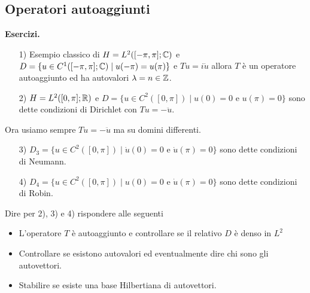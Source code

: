\subsection{Operatori autoaggiunti}

\textbf{Esercizi.}
\begin{enumerate}
	\item[1)] Esempio classico di $H = L^2([-\pi, \pi]; \mathbb C)$ e $D = \{ u \in C^1([-\pi, \pi]; \mathbb C) \mid u(-\pi) = u(\pi) \}$ e $T u = i \dot u$ allora $T$ è un operatore autoaggiunto ed ha autovalori $\lambda = n \in \mathbb Z$.
	
	\item[2)] $H = L^2([0, \pi]; \mathbb R)$ e $D = \{ u \in C^2([0, \pi]) \mid u(0) = 0 \text{ e } u(\pi) = 0 \}$ sono dette condizioni di Dirichlet con $T u = - \ddot u$.
\end{enumerate}

Ora usiamo sempre $T u = -\ddot u$ ma su domini differenti.

\begin{enumerate}
	\item[3)] $D_3 = \{ u \in C^2([0, \pi]) \mid \dot u(0) = 0 \text{ e } \dot u(\pi) = 0 \}$ sono dette condizioni di Neumann.
	
	\item[4)] $D_4 = \{ u \in C^2([0, \pi]) \mid u(0) = 0 \text{ e } \dot u(\pi) = 0 \}$ sono dette condizioni di Robin.
\end{enumerate}
Dire per 2), 3) e 4) rispondere alle seguenti
\begin{itemize}
	\item L'operatore $T$ è autoaggiunto e controllare se il relativo $D$ è denso in $L^2$
	\item Controllare se esistono autovalori ed eventualmente dire chi sono gli autovettori.
	\item Stabilire se esiste una base Hilbertiana di autovettori.
\end{itemize}

